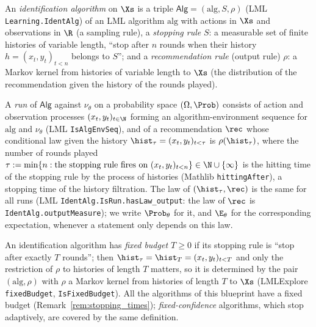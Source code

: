 \begin{definition}\label{def:bai_alg}
\leanok
{}
An \emph{identification algorithm} on $\Xs$ is a triple $\mathsf{Alg} = (\mathrm{alg}, S, \rho)$
(LML \texttt{Learning.IdentAlg}) of an LML algorithm $\mathrm{alg}$ with actions in $\Xs$ and
observations in $\R$ (a sampling rule), a \emph{stopping rule} $S$: a measurable set of finite
histories of variable length, ``stop after $n$ rounds when their history
$h = (x_t,y_t)_{t<n}$ belongs to $S$''; and a \emph{recommendation rule} (output rule) $\rho$: a
Markov kernel from histories of variable length to $\Xs$ (the distribution of the
recommendation given the history of the rounds played).

A \emph{run} of $\mathsf{Alg}$ against $\nu_\theta$ on a probability space $(\Omega, \Prob)$
consists of action and observation processes $(x_t, y_t)_{t\in\N}$ forming an
algorithm-environment sequence for $\mathrm{alg}$ and $\nu_\theta$ (LML
\texttt{IsAlgEnvSeq}), and of a recommendation $\rec$ whose conditional law given the history
$\hist_\tau = (x_t,y_t)_{t<\tau}$ is $\rho(\hist_\tau)$, where the number of rounds played
$\tau := \min\{n : \text{the stopping rule fires on } (x_t,y_t)_{t<n}\} \in \N \cup \{\infty\}$
is the hitting time of the stopping rule by the process of histories (Mathlib
\texttt{hittingAfter}), a stopping time of the history filtration. The law of
$(\hist_\tau, \rec)$ is the same for all runs (LML \texttt{IdentAlg.IsRun.hasLaw\_output}: the
law of $\rec$ is \texttt{IdentAlg.outputMeasure}); we write $\Prob_\theta$ for it, and
$\E_\theta$ for the corresponding expectation, whenever a statement only depends on this law.

An identification algorithm has \emph{fixed budget $T \ge 0$} if its stopping rule is ``stop
after exactly $T$ rounds''; then $\hist_\tau = \hist_T = (x_t,y_t)_{t<T}$ and only the
restriction of $\rho$ to histories of length $T$ matters, so it is determined by the pair
$(\mathrm{alg},\rho)$ with $\rho$ a Markov kernel from histories of length $T$ to $\Xs$
(LMLExplore \texttt{fixedBudget}, \texttt{IsFixedBudget}). All the algorithms of this
blueprint have a fixed budget (Remark~\ref{rem:stopping_times}); \emph{fixed-confidence}
algorithms, which stop adaptively, are covered by the same definition.
\end{definition}

